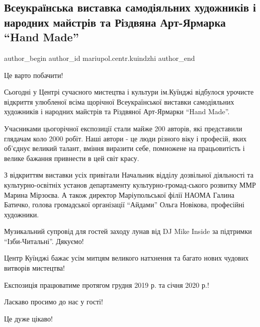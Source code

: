  
 
 
 
 

\subsection{Всеукраїнська виставка самодіяльних художників і народних майстрів та Різдвяна Арт-Ярмарка \enquote{Hand Made}}
\label{sec:14_12_2019.fb.mariupol.centr.kuindzhi.2.vseukr_vystavka_hand_made}

\ifcmt
 author_begin
   author_id mariupol.centr.kuindzhi
 author_end
\fi

Це варто побачити!

Сьогодні у Центрі сучасного мистецтва і культури ім.Куїнджі відбулося урочисте
відкриття улюбленої всіма щорічної Всеукраїнської виставки самодіяльних
художників і народних майстрів та Різдвяної Арт-Ярмарки \enquote{Hand Made}.

Учасниками цьогорічної експозиції стали майже 200 авторів, які представили
глядачам коло 2000 робіт. Наші автори - це люди різного віку і професій, яких
об'єднує великий талант, вміння виразити себе, помножене на працьовитість і
велике бажання привнести в цей світ красу.

З відкриттям виставки усіх привітали Начальник відділу дозвільної діяльності та
культурно-освітніх установ департаменту культурно-громад\hyp{}ського розвитку ММР
Марина  Мірзоєва.  А також директор Маріупольської філії НАОМА Галина  Батичко,
голова громадської організації \enquote{Айдами} Ольга Новікова, професійні художники.

Музикальний супровід для гостей заходу лунав від DJ Mike Inside за підтримки
\enquote{Ізби-Читальні}. Дякуємо!

Центр Куїнджі бажає усім митцям великого натхнення та  багато нових чудових
витворів мистецтва!

Експозиція працюватиме протягом грудня 2019 р. та січня 2020 р.!

Ласкаво просимо до нас у гості!

Це дуже цікаво!
